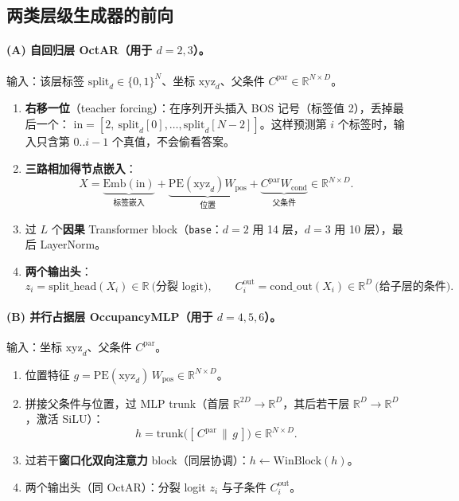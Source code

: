 \documentclass[11pt]{ctexart}
\newcommand{\code}[1]{\texttt{#1}}
\begin{document}
\subsection{两类层级生成器的前向}

\paragraph{(A) 自回归层 OctAR（用于 $d=2,3$）。}
输入：该层标签 $\mathrm{split}_d\in\{0,1\}^N$、坐标 $\mathrm{xyz}_d$、父条件 $C^{\mathrm{par}}\in\mathbb{R}^{N\times D}$。
\begin{enumerate}[leftmargin=*]
\item \textbf{右移一位}（teacher forcing）：在序列开头插入 BOS 记号（标签值 2），丢掉最后一个：
  $\mathrm{in}=[2,\ \mathrm{split}_d[0],\dots,\mathrm{split}_d[N{-}2]]$。这样预测第 $i$ 个标签时，输入只含第 $0..i{-}1$ 个真值，不会偷看答案。
\item \textbf{三路相加得节点嵌入}：
  \[X = \underbrace{\mathrm{Emb}(\mathrm{in})}_{\text{标签嵌入}} + \underbrace{\mathrm{PE}(\mathrm{xyz}_d)W_{\mathrm{pos}}}_{\text{位置}} + \underbrace{C^{\mathrm{par}}W_{\mathrm{cond}}}_{\text{父条件}} \in\mathbb{R}^{N\times D}.\]
\item 过 $L$ 个\textbf{因果} Transformer block（\code{base}：$d{=}2$ 用 14 层，$d{=}3$ 用 10 层），最后 LayerNorm。
\item \textbf{两个输出头}：
  \[z_i=\mathrm{split\_head}(X_i)\in\mathbb{R}\ \text{(分裂 logit)},\qquad
  C^{\mathrm{out}}_i=\mathrm{cond\_out}(X_i)\in\mathbb{R}^{D}\ \text{(给子层的条件)}.\]
\end{enumerate}

\paragraph{(B) 并行占据层 OccupancyMLP（用于 $d=4,5,6$）。}
输入：坐标 $\mathrm{xyz}_d$、父条件 $C^{\mathrm{par}}$。
\begin{enumerate}[leftmargin=*]
\item 位置特征 $g=\mathrm{PE}(\mathrm{xyz}_d)\,W_{\mathrm{pos}}\in\mathbb{R}^{N\times D}$。
\item 拼接父条件与位置，过 MLP trunk（首层 $\mathbb{R}^{2D}\!\to\!\mathbb{R}^{D}$，其后若干层 $\mathbb{R}^{D}\!\to\!\mathbb{R}^{D}$，激活 SiLU）：
  \[h=\mathrm{trunk}\big([\,C^{\mathrm{par}}\,\|\,g\,]\big)\in\mathbb{R}^{N\times D}.\]
\item 过若干\textbf{窗口化双向注意力} block（同层协调）：$h\leftarrow \mathrm{WinBlock}(h)$。
\item 两个输出头（同 OctAR）：分裂 logit $z_i$ 与子条件 $C^{\mathrm{out}}_i$。
\end{enumerate}
\end{document}
